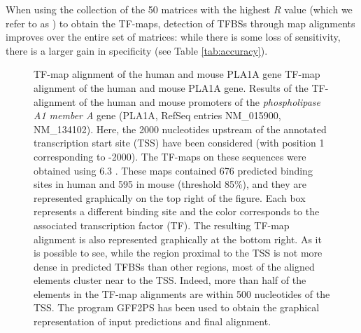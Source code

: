 \begin{center}
\end{center}

When using the collection of the 50  matrices with the highest $R$ value 
(which we refer to as ) 
to obtain the TF-maps, detection 
of TFBSs through map alignments improves over the entire set of  
matrices: while there is some loss of sensitivity, there is a larger gain 
in specificity (see Table \ref{tab:accuracy}). 

\begin{figure}[t!]
\begin{center}
\setlength{\fboxsep}{0pt}
          {TF-map alignment of the human and mouse PLA1A gene}%
          {TF-map alignment of the human and mouse PLA1A gene.}%
          {Results of the TF-alignment of the human and mouse promoters of the 
           \emph{phospholipase A1 member A} gene (PLA1A, RefSeq entries NM\_015900, 
           NM\_134102). Here, the 2000 nucleotides upstream of the annotated 
           transcription start 
           site (TSS) have been considered (with position 1 corresponding to -2000). The
           TF-maps on these sequences were obtained using  6.3
           \citep{matys:2003a}. These maps contained 676 predicted binding 
           sites in human and  595 in mouse (threshold 85\%), and they are 
           represented graphically on the top right of the
           figure. Each box represents a different binding site and the color
           corresponds to the associated transcription factor (TF). The resulting
           TF-map alignment is also represented graphically at the bottom
           right. As it is possible to see, while the region 
           proximal to the TSS is not more dense in predicted TFBSs than other regions, 
           most of the aligned elements cluster near to the TSS. Indeed, more than 
           half of the elements in the TF-map alignments are within 500 nucleotides of the TSS. 
           The program GFF2PS \citep{abril:2000a} has been used to obtain the graphical 
           representation of input predictions and final alignment.}
\end{center}
\end{figure}

